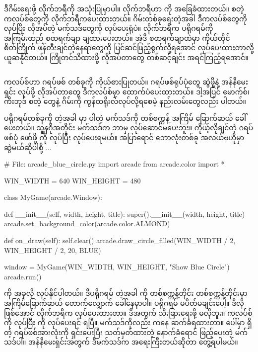 ဒီဂိမ်းရေးဖို့  လိုက်ဘရီကို အသုံးပြုမှာပါ။  လိုက်ဘရီဟာ  ကို အခြေခံထားတယ်။ \fEn{,} \fEn{,}  စတဲ့ ကလပ်စ်တွေကို လိုက်ဘရီကပေးထားတယ်။ ဂိမ်းတစ်ခုရေးတဲ့အခါ ဒီကလပ်စ်တွေကို  လုပ်ပြီး လိုအပ်တဲ့ မက်သဒ်တွေကို  လုပ်ပေးရုံပဲ။ လိုက်ဘရီက ပရိုဂရမ်ကို အကြမ်းထည် စထရက်ချာ ချထားပေးတယ်။ အဲ့ဒီ စထရက်ချာထဲမှာ ကိုယ်တိုင်စိတ်ကြိုက် ဖန်တီးချင်တဲ့နေရာတွေကို ပြင်ဆင်ဖြည့်စွက်လို့ရအောင် လုပ်ပေးထားတာလို့ ယူဆနိုင်တယ်။ ကြိုတင်သိထားဖို့ လိုအပ်တာတွေ တစ်ဆင့်ချင်း အရင်ကြည့်ရအောင်။

\subsection*{}
 ကလပ်စ်ဟာ ဂရပ်ဖစ်  တစ်ခုကို ကိုယ်စားပြုတယ်။ ဂရပ်ဖစ်ရုပ်ပုံတွေ ဆွဲဖို့နဲ့ အန်နီမေးရှင်း လုပ်ဖို့ လိုအပ်တာတွေ ဒီကလပ်စ်မှာ ထောက်ပံပေးထားတယ်။ ဒါ့အပြင် မောက်စ်၊ ကီးဘုဒ် စတဲ့  တွေနဲ့ ဂိမ်းကို ကွန်ထရိုးလ်လုပ်လို့ရစေမဲ့ နည်းလမ်းတွေလည်း ပါတယ်။

 ပရိုဂရမ်တစ်ခုကို  တဲ့အခါ  မှာ ပါတဲ့   မက်သဒ်ကို တစ်စက္ကန့် အကြိမ် ခြောက်ဆယ် ခေါ်ပေးတယ်။ သူ့နဂိုအတိုင်း  မက်သဒ်က ဘာမှ လုပ်ဆောင်မပေးဘူး။ ကိုယ့်လိုချင်တဲ့ ဂရပ်ဖစ်ပုံ ဖော်ဖို့  ကို  လုပ်ပြီး  လုပ်ပေးရမယ်။  အပြာရောင် ဘောလုံးတစ်ခု အလယ်ဗဟိုမှာ ဆွဲမယ်ဆိုပါစို့ $\ldots$

%
\begin{py}
# File: arcade_blue_circle.py
import arcade
from arcade.color import *

WIN_WIDTH = 640
WIN_HEIGHT = 480

class MyGame(arcade.Window):

    def __init__(self, width, height, title):
        super().__init__(width, height, title)
        arcade.set_background_color(arcade.color.ALMOND)

    def on_draw(self):
        self.clear()
        arcade.draw_circle_filled(WIN_WIDTH / 2, WIN_HEIGHT / 2, 20, BLUE)

window = MyGame(WIN_WIDTH, WIN_HEIGHT, "Show Blue Circle")
arcade.run()
\end{py}
%
 ကို အခုလို   လုပ်နိုင်ပါတယ်။ ဒီပရိုဂရမ်  တဲ့အခါ  ကို တစ်စက္ကန့်တိုင်း တစ်စက္ကန့်တိုင်းမှာ အကြိမ်ခြောက်ဆယ်  တောက်လျှောက် ခေါ်နေမှာပါ။ ပရိုဂရမ်  မပိတ်မချင်းပေါ့။ ဒီလိုဖြစ်အောင်  လိုက်ဘရီက လုပ်ပေးထားတာ။ ဒီအတွက် သီးခြားရေးဖို့ မလိုဘူး။  ကလပ်စ်ကို  လုပ်ပြီး  ကို  လုပ်ပေးရင် ရပြီ။  မက်သဒ်ကိုလည်း   ကနေ ဆက်ခံရထားတာ။  ပေါ်မှာ ရှိတဲ့ ဂရပ်ဖစ်အားလုံးကို ရှင်းပေးပြီး သတ်မှတ်ထားတဲ့ နောက်ခံရောင် ဖြည့်ပေးတဲ့ မက်သဒ်ပါ။  အန်နီမေးရှင်းအတွက် ဒီမက်သဒ်က အရေးကြီးတယ်ဆိုတာ တွေ့ရပါမယ်။ 


